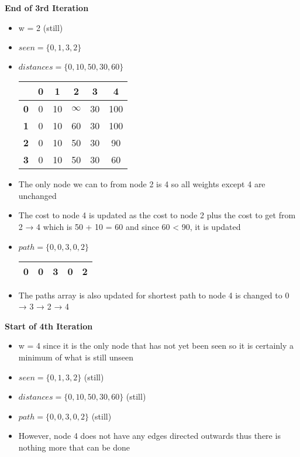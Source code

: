 \documentclass[10pt, 
a4paper, 
oneside, 
headinclude, footinclude, 
BCOR5mm]
{scrartcl}
\begin{document}
\textbf{End of 3rd Iteration}
\begin{itemize}
    \item w = 2 (still)
    \item $seen = \{0, 1, 3, 2\}$
    \item $distances = \{0, 10, 50, 30, 60\}$
    \begin{center}
        \begin{tabular}{|c|c|c|c|c|c|}
            \hline
            & \textbf{0} & \textbf{1} & \textbf{2} & \textbf{3} & \textbf{4} \\
            \hline
            \textbf{0} & 0 & 10 & $\infty$ & 30 & 100 \\
            \hline
            \textbf{1} & 0 & 10 & 60 & 30 & 100 \\
            \hline
            \textbf{2} & 0 & 10 & 50 & 30 & 90 \\
            \hline
            \textbf{3} & 0 & 10 & 50 & 30 & 60 \\
            \hline
        \end{tabular}
    \end{center}
    \item The only node we can to from node 2 is 4 so all weights except 4 are unchanged
    \item The cost to node 4 is updated as the cost to node 2 plus the cost to get from 2 → 4 which is 50 + 10 = 60 and
    since 60 < 90, it is updated
    \item $path = \{0, 0, 3, 0, 2\}$
    \begin{center}
        \begin{tabular}{|c|c|c|c|c|}
            \hline
            0 & 0 & 3 & 0 & 2 \\
            \hline
        \end{tabular}
    \end{center} 
    \item The paths array is also updated for shortest path to node 4 is changed to 0 → 3 → 2 → 4
\end{itemize}
\textbf{Start of 4th Iteration}
\begin{itemize}
    \item w = 4 since it is the only node that has not yet been seen so it is certainly a minimum of what is still unseen
    \item $seen = \{0, 1, 3, 2\}$ (still)
    \item $distances = \{0, 10, 50, 30, 60\}$ (still)
    \item $path = \{0, 0, 3, 0, 2\}$ (still)
    \item However, node 4 does not have any edges directed outwards thus there is nothing more that can be done
\end{itemize}
\end{document}
